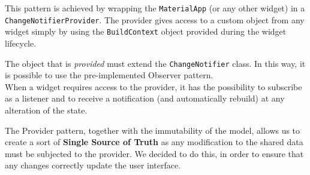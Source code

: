 This pattern is achieved by wrapping the \texttt{MaterialApp} (or any other widget) in a \texttt{ChangeNotifierProvider}.
The provider gives access to a custom object from any widget simply by using the \texttt{BuildContext} object provided during the widget lifecycle.

The object that is \emph{provided} must extend the \texttt{ChangeNotifier} class. In this way, it is possible to use the pre-implemented Observer pattern.\\
When a widget requires access to the provider, it has the possibility to subscribe as a listener and to receive a notification (and automatically rebuild) at any alteration of the state.

The Provider pattern, together with the immutability of the model, allows us to create a sort of \textbf{Single Source of Truth} as any modification to the shared data must be subjected to the provider.
We decided to do this, in order to ensure that any changes correctly update the user interface.

